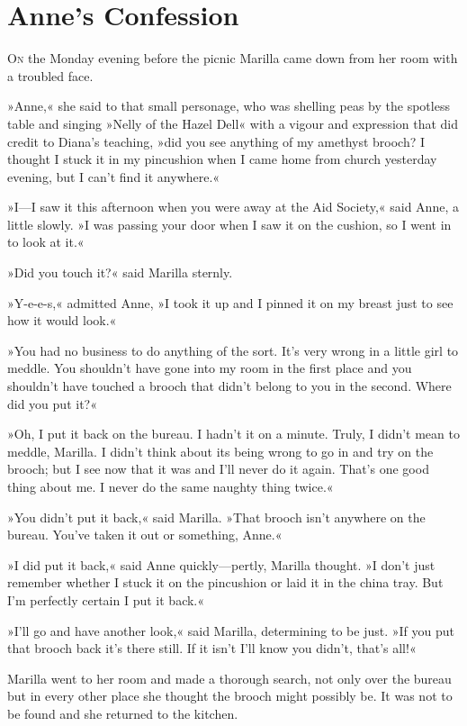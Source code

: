 \chapter{Anne’s Confession}

\lettrine[lines=4]{O}{n} the Monday evening before the picnic Marilla came down from her room with a troubled face.

\zz
»Anne,« she said to that small personage, who was shelling peas by the spotless table and singing »Nelly of the Hazel Dell« with a vigour and expression that did credit to Diana’s teaching, »did you see anything of my amethyst brooch? I thought I stuck it in my pincushion when I came home from church yesterday evening, but I can’t find it anywhere.«

»I—I saw it this afternoon when you were away at the Aid Society,« said Anne, a little slowly. »I was passing your door when I saw it on the cushion, so I went in to look at it.«

»Did you touch it?« said Marilla sternly.

»Y-e-e-s,« admitted Anne, »I took it up and I pinned it on my breast just to see how it would look.«

»You had no business to do anything of the sort. It’s very wrong in a little girl to meddle. You shouldn’t have gone into my room in the first place and you shouldn’t have touched a brooch that didn’t belong to you in the second. Where did you put it?«

»Oh, I put it back on the bureau. I hadn’t it on a minute. Truly, I didn’t mean to meddle, Marilla. I didn’t think about its being wrong to go in and try on the brooch; but I see now that it was and I’ll never do it again. That’s one good thing about me. I never do the same naughty thing twice.«

»You didn’t put it back,« said Marilla. »That brooch isn’t anywhere on the bureau. You’ve taken it out or something, Anne.«

»I did put it back,« said Anne quickly—pertly, Marilla thought. »I don’t just remember whether I stuck it on the pincushion or laid it in the china tray. But I’m perfectly certain I put it back.«

»I’ll go and have another look,« said Marilla, determining to be just. »If you put that brooch back it’s there still. If it isn’t I’ll know you didn’t, that’s all!«

Marilla went to her room and made a thorough search, not only over the bureau but in every other place she thought the brooch might possibly be. It was not to be found and she returned to the kitchen.

